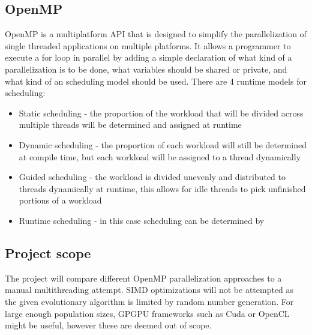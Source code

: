 \documentclass[journal,transmag]{IEEEtran}
\begin{document}
\subsection{OpenMP}
        OpenMP \cite{openmp} is a multiplatform API that is designed to simplify the parallelization of 
        single threaded applications on multiple platforms. It allows a programmer to 
        execute a for loop in parallel by adding a simple declaration of what kind of a 
        parallelization is to be done, what variables should be shared or private, and
        what kind of an scheduling model should be used. There are 4 runtime models for
        scheduling:
        \begin{itemize}
                \item Static scheduling - the proportion of the workload that will be divided across multiple threads
                    will be determined and assigned at runtime
                \item Dynamic scheduling - the proportion of each workload will still be determined
                    at compile time, but each workload will be assigned to a thread dynamically
                \item  Guided scheduling - the workload is divided unevenly and distributed to
                    threads dynamically at runtime, this allows for idle threads to pick unfinished
                    portions of a workload
                   
                \item Runtime scheduling - in this case scheduling can be determined by 
        \end{itemize}

	

\subsection{Project scope}
        The project will compare different OpenMP parallelization approaches to a manual multithreading
        attempt. SIMD optimizations will not be attempted as the given evolutionary algorithm 
        is limited by random number generation. For large enough population sizes, GPGPU frameworks
        such as Cuda or OpenCL might be useful, however these are deemed out of scope. 
	
\end{document}
